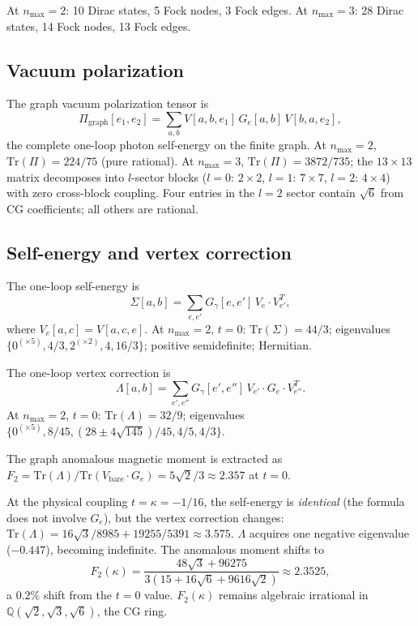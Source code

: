 \documentclass[11pt]{article}
\begin{document}
At $n_{\max} = 2$: 10 Dirac states, 5 Fock nodes, 3 Fock edges.
At $n_{\max} = 3$: 28 Dirac states, 14 Fock nodes, 13 Fock edges.

\subsection{Vacuum polarization}

The graph vacuum polarization tensor is
\[
  \Pi_{\text{graph}}[e_1, e_2] = \sum_{a,b} V[a,b,e_1]\, G_e[a,b]\, V[b,a,e_2],
\]
the complete one-loop photon self-energy on the finite graph.
At $n_{\max} = 2$, $\mathrm{Tr}(\Pi) = 224/75$ (pure rational).
At $n_{\max} = 3$, $\mathrm{Tr}(\Pi) = 3872/735$;  the $13 \times 13$
matrix decomposes into $l$-sector blocks ($l = 0$: $2 \times 2$,
$l = 1$: $7 \times 7$, $l = 2$: $4 \times 4$) with zero cross-block
coupling.  Four entries in the $l = 2$ sector contain $\sqrt{6}$ from
CG coefficients; all others are rational.

\subsection{Self-energy and vertex correction}

The one-loop self-energy is
\[
  \Sigma[a,b] = \sum_{e,e'} G_\gamma[e,e']\, V_e \cdot V_{e'}^T,
\]
where $V_e[a,c] = V[a,c,e]$.  At $n_{\max} = 2$, $t = 0$:
$\mathrm{Tr}(\Sigma) = 44/3$; eigenvalues $\{0^{(\times 5)}, 4/3, 2^{(\times 2)},
4, 16/3\}$; positive semidefinite; Hermitian.

The one-loop vertex correction is
\[
  \Lambda[a,b] = \sum_{e',e''} G_\gamma[e',e'']\, V_{e'} \cdot G_e \cdot V_{e''}^T.
\]
At $n_{\max} = 2$, $t = 0$: $\mathrm{Tr}(\Lambda) = 32/9$; eigenvalues
$\{0^{(\times 5)}, 8/45, (28 \pm 4\sqrt{145})/45, 4/5, 4/3\}$.

The graph anomalous magnetic moment is extracted as
$F_2 = \mathrm{Tr}(\Lambda) / \mathrm{Tr}(V_{\mathrm{bare}} \cdot G_e)
= 5\sqrt{2}/3 \approx 2.357$ at $t = 0$.

At the physical coupling $t = \kappa = -1/16$, the self-energy is
\emph{identical} (the formula does not involve $G_e$), but the vertex
correction changes: $\mathrm{Tr}(\Lambda) = 16\sqrt{3}/8985 + 19255/5391
\approx 3.575$.  $\Lambda$ acquires one negative eigenvalue ($-0.447$),
becoming indefinite.  The anomalous moment shifts to
\[
  F_2(\kappa) = \frac{48\sqrt{3} + 96275}{3(15 + 16\sqrt{6} + 9616\sqrt{2})}
  \approx 2.3525,
\]
a $0.2\%$ shift from the $t = 0$ value.  $F_2(\kappa)$ remains algebraic
irrational in $\mathbb{Q}(\sqrt{2}, \sqrt{3}, \sqrt{6})$, the CG ring.
\end{document}
